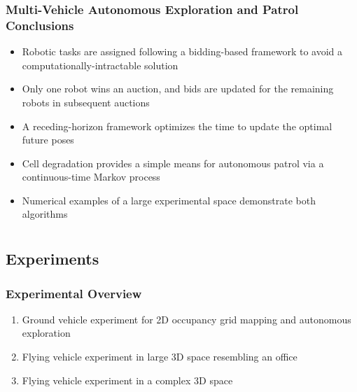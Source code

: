 \documentclass[11pt,professionalfonts,hyperref={pdftex,pdfpagemode=none,pdfstartview=FitH}]{beamer}
\begin{document}
%
%
%
%


\begin{frame}
\frametitle{Multi-Vehicle Autonomous Exploration and Patrol Conclusions}

\begin{itemize}
	\item Robotic tasks are assigned following a bidding-based framework to avoid a computationally-intractable solution
	\item Only one robot wins an auction, and bids are updated for the remaining robots in subsequent auctions
	\item A receding-horizon framework optimizes the time to update the optimal future poses
	\item Cell degradation provides a simple means for autonomous patrol via a continuous-time Markov process
	\item Numerical examples of a large experimental space demonstrate both algorithms
\end{itemize}
\end{frame}



\section*{}
\subsection*{Experiments}

\begin{frame}
\frametitle{Experimental Overview}

\begin{enumerate}
	\item Ground vehicle experiment for 2D occupancy grid mapping and autonomous exploration
	\item Flying vehicle experiment in large 3D space resembling an office
	\item Flying vehicle experiment in a complex 3D space
\end{enumerate}
\end{frame}
\end{document}
